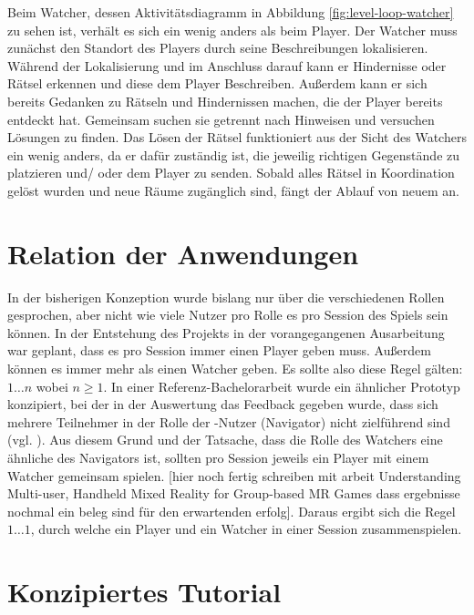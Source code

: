 Beim Watcher, dessen Aktivitätsdiagramm in Abbildung \ref{fig:level-loop-watcher} zu sehen ist, verhält es sich ein wenig anders als beim Player. Der Watcher muss zunächst den Standort des Players durch seine Beschreibungen lokalisieren. Während der Lokalisierung und im Anschluss darauf kann er Hindernisse oder Rätsel erkennen und diese dem Player Beschreiben. Außerdem kann er sich bereits Gedanken zu Rätseln und Hindernissen machen, die der Player bereits entdeckt hat. Gemeinsam suchen sie getrennt nach Hinweisen und versuchen Lösungen zu finden. Das Lösen der Rätsel funktioniert aus der Sicht des Watchers ein wenig anders, da er dafür zuständig ist, die jeweilig richtigen Gegenstände zu platzieren und/ oder dem Player zu senden. Sobald alles Rätsel in Koordination gelöst wurden und neue Räume zugänglich sind, fängt der Ablauf von neuem an.

\section{Relation der Anwendungen}
In der bisherigen Konzeption wurde bislang nur über die verschiedenen Rollen gesprochen, aber nicht wie viele Nutzer pro Rolle es pro Session des Spiels sein können. In der Entstehung des Projekts in der vorangegangenen Ausarbeitung war geplant, dass es pro Session immer einen Player geben muss. Außerdem können es immer mehr als einen Watcher geben. Es sollte also diese Regel gälten: $1\ldots n$ \quad wobei $n \geq 1$. In einer Referenz-Bachelorarbeit wurde ein ähnlicher Prototyp konzipiert, bei der in der Auswertung das Feedback gegeben wurde, dass sich mehrere Teilnehmer in der Rolle der -Nutzer (Navigator) nicht zielführend sind (vgl. \cite[S. 34]{lotz_konzeption_2021}). Aus diesem Grund und der Tatsache, dass die Rolle des Watchers eine ähnliche des Navigators ist, sollten pro Session jeweils ein Player mit einem Watcher gemeinsam spielen. [hier noch fertig schreiben mit arbeit Understanding Multi-user, Handheld Mixed Reality for Group-based MR Games dass ergebnisse nochmal ein beleg sind für den erwartenden erfolg]. Daraus ergibt sich die Regel $1\ldots1$, durch welche ein Player und ein Watcher in einer Session zusammenspielen.

\section{Konzipiertes Tutorial}

